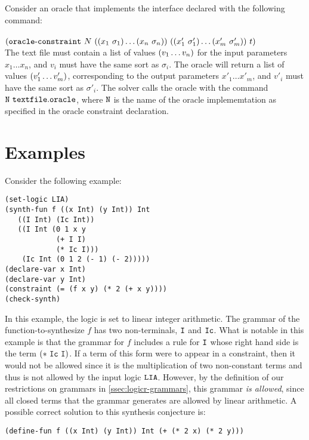 \documentclass[english,a4paper,10pt]{article}
\begin{document}
\noindent Consider an oracle that implements the interface declared with the following command:\\\\
${\tt (}{\tt oracle\mbox{-}constraint}\mbox{ } N \mbox{ }
{\tt (}{\tt (}x_1\mbox{ }\sigma_1{\tt )} \ldots {\tt (}x_n\mbox{ }\sigma_n{\tt )}{\tt )}\mbox{ }
{\tt (}{\tt (}x'_{1}\mbox{ }\sigma'_{1}{\tt )} \ldots {\tt (}x'_{m}\mbox{ }\sigma'_{m}{\tt )}{\tt )}  \mbox{ } t{\tt )}$ \\

The text file must contain a list of values ${\tt (}v_1 \ldots v_n{\tt )}$ for the input parameters $x_1 \ldots x_n$, and $v_i$ must have the same sort as $\sigma_i$.
The oracle will return a list of values ${\tt (}v'_{1} \ldots v'_{m}{\tt )}$, corresponding to the output parameters $x'_{1} \ldots x'_{m}$, and $v'_i$ must have the same sort as $\sigma'_i$.
%
The solver calls the oracle with the command ${\tt N \,\,textfile.oracle}$, where ${\tt N}$ is the name of the oracle implememtation as specified in the oracle constraint declaration.


\section{Examples}
\label{sec:examples}


\begin{example}
Consider the following example:
\begin{lstlisting}[basicstyle={\ttfamily}]
(set-logic LIA)
(synth-fun f ((x Int) (y Int)) Int
   ((I Int) (Ic Int))
   ((I Int (0 1 x y
            (+ I I)
            (* Ic I)))
    (Ic Int (0 1 2 (- 1) (- 2)))))
(declare-var x Int)
(declare-var y Int)
(constraint (= (f x y) (* 2 (+ x y))))
(check-synth)
\end{lstlisting}
In this example, the logic is set 
to linear integer arithmetic.
The grammar of the function-to-synthesize $f$
has two non-terminals, ${\tt I}$ and ${\tt Ic}$.
What is notable in this example is that
the grammar for $f$ includes a rule for ${\tt I}$ whose right hand side 
is the term ${\tt(*\ Ic\ I)}$. 
If a term of this form were to appear
in a constraint, 
then it would not be allowed since it is the
multiplication of two non-constant terms and thus is not allowed by the input logic ${\tt LIA}$.
However, 
by the definition of our restrictions on grammars in \cref{ssec:logicr-grammars},
this grammar \emph{is allowed},
since all closed terms that the grammar generates are allowed by linear arithmetic.
A possible correct solution to this synthesis conjecture is:
\begin{lstlisting}[basicstyle={\ttfamily}]
(define-fun f ((x Int) (y Int)) Int (+ (* 2 x) (* 2 y)))
\end{lstlisting}
\end{example}
\end{document}
